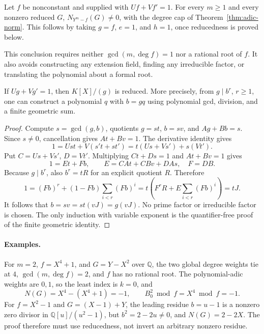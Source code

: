 \begin{corollary}
\label{cor:automatic-squarefree}
Let \(f\) be nonconstant and supplied with \(Uf+Vf'=1\).
For every \(m\geq1\) and every nonzero reduced \(G\),
\(N_{Y^m-f}(G)\ne0\), with the degree cap of
Theorem~\ref{thm:adic-norm}.  This follows by taking
\(g=f\), \(e=1\), and \(h=1\), once reducedness is proved below.
\end{corollary}

This conclusion requires neither \(\gcd(m,\deg f)=1\) nor a rational
root of \(f\).  It also avoids constructing any extension field, finding
any irreducible factor, or translating the polynomial about a formal root.

\begin{lemma}
\label{lem:adic-reducedness}
If \(Ug+Vg'=1\), then \(K[X]/(g)\) is reduced.  More precisely,
from \(g\mid b^r\), \(r\geq1\), one can construct a polynomial
\(q\) with \(b=gq\) using polynomial gcd, division, and a finite
geometric sum.
\end{lemma}

\begin{proof}
Compute \(s=\gcd(g,b)\), quotients \(g=st\), \(b=sv\), and
\(Ag+Bb=s\).  Since \(s\ne0\), cancellation gives
\(At+Bv=1\).  The derivative identity gives
\[
 1=Ust+V(s't+st')=t(Us+Vs')+s(Vt').
\]
Put \(C=Us+Vs'\), \(D=Vt'\).  Multiplying
\(Ct+Ds=1\) and \(At+Bv=1\) gives
\[
 1=Et+Fb,
 \qquad E=CAt+CBv+DAs,\quad F=DB.
\]
Because \(g\mid b^r\), also \(b^r=tR\) for an explicit quotient
\(R\).  Therefore
\[
 1=(Fb)^r+(1-Fb)\sum_{i<r}(Fb)^i
   =t\left(F^rR+E\sum_{i<r}(Fb)^i\right)=tJ.
\]
It follows that \(b=sv=st(vJ)=g(vJ)\).
No prime factor or irreducible factor is chosen.  The only induction with
variable exponent is the quantifier-free proof of the finite geometric
identity.
\end{proof}

\paragraph{Examples.}
For \(m=2\), \(f=X^4+1\), and \(G=Y-X^2\) over
\(\mathbb Q\), the two global degree weights tie at \(4\),
\(\gcd(m,\deg f)=2\), and \(f\) has no rational root.  The
polynomial-adic weights are \(0,1\), so the least index is \(k=0\),
and
\[
 N(G)=X^4-(X^4+1)=-1,
 \qquad B_0^2\bmod f=X^4\bmod f=-1.
\]
For \(f=X^2-1\) and \(G=(X-1)+Y\), the leading residue
\(b=u-1\) is a nonzero zero divisor in
\(\mathbb Q[u]/(u^2-1)\), but \(b^2=2-2u\ne0\), and
\(N(G)=2-2X\).  The proof therefore must use reducedness, not invert
an arbitrary nonzero residue.

